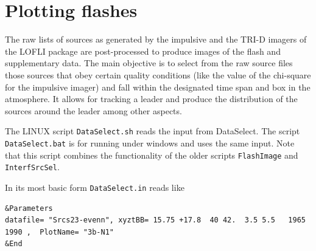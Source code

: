 \section{Plotting flashes}

The raw lists of sources as generated by the impulsive and the TRI-D imagers of the LOFLI package are post-processed to produce images of the flash and supplementary data. The main objective is to select from the raw source files those sources that obey certain quality conditions (like the value of the chi-square for the impulsive imager) and fall within the designated time span and box in the atmosphere. It allows for tracking a leader and produce the distribution of the sources around the leader among other aspects.

The LINUX script \verb!DataSelect.sh! reads the input from DataSelect. The script \verb!DataSelect.bat! is for running under windows and uses the same input. Note that this script combines the functionality of the older scripts \verb!FlashImage! and \verb!InterfSrcSel!.

In its most basic form \verb!DataSelect.in! reads like

\begin{linenumbers}
\resetlinenumber
\footnotesize
\begin{verbatim}
&Parameters
datafile= "Srcs23-evenn", xyztBB= 15.75 +17.8  40 42.  3.5 5.5   1965 1990 ,  PlotName= "3b-N1"
&End
\end{verbatim}
\end{linenumbers}


